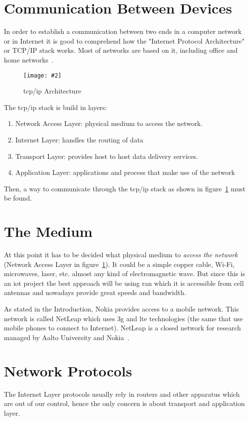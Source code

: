 \documentclass[hidelinks,11pt,a4paper,oneside,article]{memoir}
\newcommand{\putimage}[3][10] %
{
\begin{figure}[h]
	\centering
	\captionsetup{justification=centering}
	\texttt{[image: \#2]}
	\caption{#3}
	\label{fig:#2}
\end{figure}
}
\begin{document}
\section{Communication Between Devices}
In order to establish a communication between two ends in a computer network or in Internet it is good to comprehend how the "Internet Protocol Architecture" or TCP/IP stack works. Most of networks are based on it, including office and home networks~\cite[9]{tcpip}.

	\putimage[5]{tcpip}{\gls{tcp}/\gls{ip} Architecture}

The \gls{tcp}/\gls{ip} stack is build in layers:
\begin{enumerate}
	\item Network Access Layer: physical medium to access the network.
	\item Internet Layer: handles the routing of data
	\item Transport Layer: provides host to host data delivery services.
	\item Application Layer: applications and process that make use of the network
\end{enumerate}

Then, a way to communicate through the \gls{tcp}/\gls{ip} stack as shown in figure~\ref{fig:tcpip} must be found.

\section{The Medium}\label{sec:the-medium}
At this point it has to be decided what physical medium to \textit{access the network} (Network Access Layer in figure~\ref{fig:tcpip}). It could be a simple copper cable, Wi-Fi, microwaves, laser, etc. almost any kind of electromagnetic wave. But since this is an \gls{iot} project the best approach will be using \gls{ran} which it is accessible from cell antennas and nowadays provide great speeds and bandwidth.

As stated in the Introduction, Nokia provides access to a mobile network. This network is called NetLeap which uses \gls{3g} and \gls{lte} technologies (the same that use mobile phones to connect to Internet). NetLeap is a closed network for research managed by Aalto University and Nokia~\cite{netleap}.

\section{Network Protocols}
The Internet Layer protocols usually rely in routers and other apparatus which are out of our control, hence the only concern is about transport and application layer.
\end{document}
